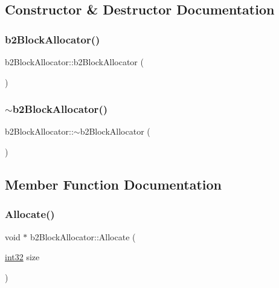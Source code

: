 \subsection{Constructor \& Destructor Documentation}
\mbox{\label{classb2_block_allocator_aed5dab4fea4c2636724dac550105f8c1}} 
\subsubsection{\texorpdfstring{b2BlockAllocator()}{b2BlockAllocator()}}
{\footnotesize\ttfamily b2\+Block\+Allocator\+::b2\+Block\+Allocator (\begin{DoxyParamCaption}{ }\end{DoxyParamCaption})}

\mbox{\label{classb2_block_allocator_a4179da8aa8fc463cd06adeab926e9c89}} 
\subsubsection{\texorpdfstring{$\sim$b2BlockAllocator()}{~b2BlockAllocator()}}
{\footnotesize\ttfamily b2\+Block\+Allocator\+::$\sim$b2\+Block\+Allocator (\begin{DoxyParamCaption}{ }\end{DoxyParamCaption})}



\subsection{Member Function Documentation}
\mbox{\label{classb2_block_allocator_a437bf775c23f6e36af11a6d1653d7040}} 
\subsubsection{\texorpdfstring{Allocate()}{Allocate()}}
{\footnotesize\ttfamily void $\ast$ b2\+Block\+Allocator\+::\+Allocate (\begin{DoxyParamCaption}\item[{\mbox{\hyperlink{b2_settings_8h_a43d43196463bde49cb067f5c20ab8481}{int32}}}]{size }\end{DoxyParamCaption})}



